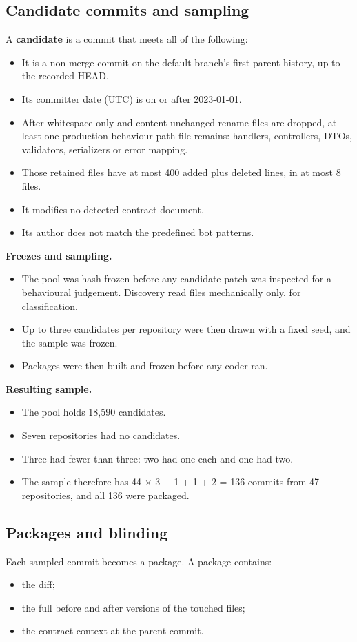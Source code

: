 \documentclass[conference]{IEEEtran}
\begin{document}
\subsection{Candidate commits and sampling}
A \textbf{candidate} is a commit that meets all of the following:
\begin{itemize}
\item It is a non-merge commit on the default branch's first-parent history, up to the recorded HEAD.
\item Its committer date (UTC) is on or after 2023-01-01.
\item After whitespace-only and content-unchanged rename files are dropped, at least one production behaviour-path file remains: handlers, controllers, DTOs, validators, serializers or error mapping.
\item Those retained files have at most 400 added plus deleted lines, in at most 8 files.
\item It modifies no detected contract document.
\item Its author does not match the predefined bot patterns.
\end{itemize}

\textbf{Freezes and sampling.}
\begin{itemize}
\item The pool was hash-frozen before any candidate patch was inspected for a behavioural judgement. Discovery read files mechanically only, for classification.
\item Up to three candidates per repository were then drawn with a fixed seed, and the sample was frozen.
\item Packages were then built and frozen before any coder ran.
\end{itemize}

\textbf{Resulting sample.}
\begin{itemize}
\item The pool holds 18,590 candidates.
\item Seven repositories had no candidates.
\item Three had fewer than three: two had one each and one had two.
\item The sample therefore has 44 $\times$ 3 + 1 + 1 + 2 = 136 commits from 47 repositories, and all 136 were packaged.
\end{itemize}

\subsection{Packages and blinding}
Each sampled commit becomes a package. A package contains:
\begin{itemize}
\item the diff;
\item the full before and after versions of the touched files;
\item the contract context at the parent commit.
\end{itemize}
\end{document}
